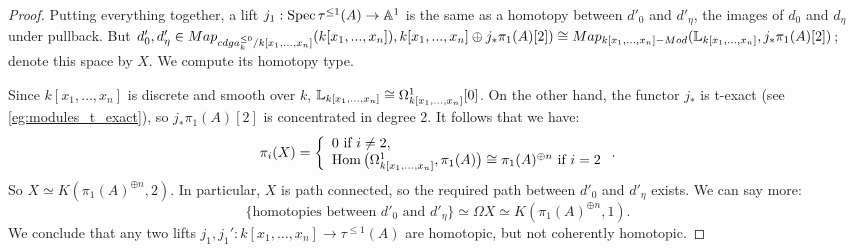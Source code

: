 \documentclass[10pt,a4paper,reqno,oneside]{book} %
\theoremstyle{plain}
\theoremstyle{definition}
\theoremstyle{remark}
\numberwithin{equation}{section}
\begin{document}
\begin{proof}
Putting everything together, a lift $j_1 : \operatorname{Spec} \tau^{\leq 1}(A) \to \mathbb A^1$ is the same as a homotopy between $d'_0$
and $ d'_{\eta}$, the images of $d_0$ and $d_{\eta}$ under pullback. 
But $d'_{0},d'_{\eta} \in Map_{cdga_k^{\leq 0} / k[x_{1},...,x_{n}]}(k[x_{1},...,x_{n}]), k[x_{1},...,x_{n}]\oplus 
j_{*}\pi_{1}(A)[2])\cong Map_{k[x_{1},...,x_{n}]-Mod}(\mathbb L_{k[x_{1},...,x_{n}]}, j_{*}\pi_{1}(A)[2])$; denote this space
by $X$. We compute its homotopy type. 

Since $k[x_1, \dots, x_n]$ is discrete and smooth over $k$, $\mathbb L_{k[x_1, \dots, x_n]} \cong \Omega^1_{k[x_1, \dots, x_n]}[0]$.
On the other hand, the functor $j_*$ is t-exact (see \ref{eg:modules_t_exact}), so $j_* \pi_1(A)[2]$ is concentrated in degree 2.
It follows that we have:
\[	\pi_i(X) = \left\{ \begin{array} {l} 0 \text{ if } i \neq 2, \\ 
\operatorname{Hom}\big(\Omega^1_{k[x_1, \dots, x_n]}, \pi_1(A)\big) \cong \pi_1(A)^{\oplus n} \text{ if } i = 2 \end{array}\right. .	\]
So $X \simeq K(\pi_1(A)^{\oplus n}, 2)$. In particular, $X$ is path connected, so the required path between $d'_0$ and $d'_{\eta}$
exists. We can say more:
\[	\{ \text{homotopies between } d'_0 \text{ and } d'_{\eta} \} \simeq \Omega X \simeq K(\pi_1(A)^{\oplus n}, 1).	\]
We conclude that any two lifts $j_1, j_1' : k[x_1, \dots, x_n] \to \tau^{\leq 1}(A)$ are homotopic, but not coherently
homotopic.
\end{proof}





\end{document}
